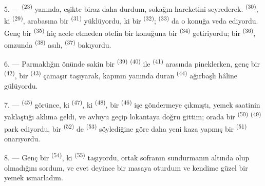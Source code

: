 5. ---  \textsuperscript{(23)} yanında, eşikte biraz
daha durdum, sokağın hareketini seyrederek. 
\textsuperscript{(30)}, ki  \textsuperscript{(29)},
arabasına bir  \textsuperscript{(31)} yüklüyordu, ki bir
 \textsuperscript{(32)}; 
\textsuperscript{(33)} da o konuğa veda ediyordu. Genç bir  \textsuperscript{(35)} hiç acele etmeden otelin bir konuğuna bir
 \textsuperscript{(34)} getiriyordu; bir 
\textsuperscript{(36)}, omzunda 
\textsuperscript{(38)} asılı,  \textsuperscript{(37)}
bakıyordu.

\VUsaut{4.0mm}
\VUsaut{3.0mm}

6. --- Parmaklığın önünde sakin bir 
\textsuperscript{(39)}  \textsuperscript{(40)} ile
 \textsuperscript{(41)} arasında pineklerken,
genç bir  \textsuperscript{(42)}, bir 
\textsuperscript{(43)} çamaşır taşıyarak, kapının yanında duran  \textsuperscript{(44)} ağırbaşlı hâline gülüyordu.

7. ---  \textsuperscript{(45)} görünce, ki
 \textsuperscript{(47)}, ki 
\textsuperscript{(48)}, bir
 \textsuperscript{(46)} işe göndermeye çıkmıştı, yemek
saatinin yaklaştığı aklıma geldi, ve avluyu geçip lokantaya doğru gittim;
orada bir  \textsuperscript{(50)} 
\textsuperscript{(49)} park ediyordu, bir 
\textsuperscript{(52)} de  \textsuperscript{(53)}
söylediğine göre daha yeni kaza yapmış bir 
\textsuperscript{(51)} onarıyordu.

8. --- Genç bir  \textsuperscript{(54)}, ki  \textsuperscript{(55)} taşıyordu, ortak sofranın sundurmanın altında olup
olmadığını sordum, ve evet deyince bir masaya oturdum ve kendime güzel bir
yemek ısmarladım.


\VUsaut{4.0mm}
\VUsaut{3.0mm}

